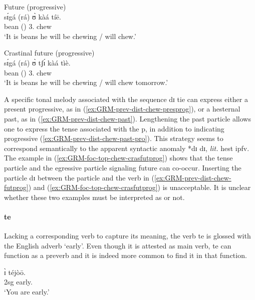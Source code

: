 \begin{exe}
\begin{exe}
\begin{exe}
\begin{exe}
\begin{exe}
\begin{exe}
\begin{exe}
\begin{exe}
\begin{exe}
\begin{exe}
\begin{exe}
\begin{exe}
 \ex\label{ex:GRM-prev-dist-chew-futprog}{\rm Future (progressive)}\\
\gll  sɪ́gá (rá) ʊ̀  kàá   tíē.\\
 bean  ({\foc}) {3.\sg} {\fut}  chew\\
\glt `It is {\sc beans} he will be chewing / will chew.'

 \ex\label{ex:GRM-foc-top-chew-crasfutprog}{\rm Crastinal future 
(progressive)}\\
\gll  sɪ́gá (rá) ʊ̀ tʃɪ́  kàá   tìè.\\
 bean  ({\foc}) {3.\sg} {\cras} {\fut}   chew\\
\glt `It is {\sc beans} he will be chewing / will chew tomorrow.'


\z 
 \z 
 
 
A specific tonal melody associated with  the sequence {\sls dɪ tie} can express 
either a present progressive, as in (\ref{ex:GRM-prev-dist-chew-presprog}),  or 
a hesternal past, as in  (\ref{ex:GRM-prev-dist-chew-past}). Lengthening the 
 past particle allows one to express the tense associated with the 
p, in addition to indicating  progressive 
(\ref{ex:GRM-prev-dist-chew-past-pro}). This strategy seems to correspond 
semantically  to the apparent syntactic anomaly *{\sls dɪ dɪ},  {\it lit.} {\sc 
 hest} {\sc ipfv}.  The example in (\ref{ex:GRM-foc-top-chew-crasfutprog}) 
shows that the  tense particle and the egressive particle signaling  
future  can co-occur.  Inserting the  particle {\sls  dɪ} between 
the  particle and the verb in  (\ref{ex:GRM-prev-dist-chew-futprog}) 
and (\ref{ex:GRM-foc-top-chew-crasfutprog}) is  unacceptable. It is unclear 
whether these two examples must be interpreted as  or not.  



\paragraph{te}
\label{sec:GRM-preverb-te}

Lacking a corresponding verb to capture its meaning, the verb {\sls te} is glossed with the English adverb `early'. Even though  it is attested as main verb,  {\sls te} can  function  as a preverb and it is indeed more common to find it in that function. 


 \ea\label{ex:GRM-prev-early}
 \ea \gll  ɪ̀ téjòō.\\
  {\sc 2sg} early.{\foc}\\
\glt  `You are early.'



\end{exe}
\end{exe}
\end{exe}
\end{exe}
\end{exe}
\end{exe}
\end{exe}
\end{exe}
\end{exe}
\end{exe}
\end{exe}
\end{exe}
